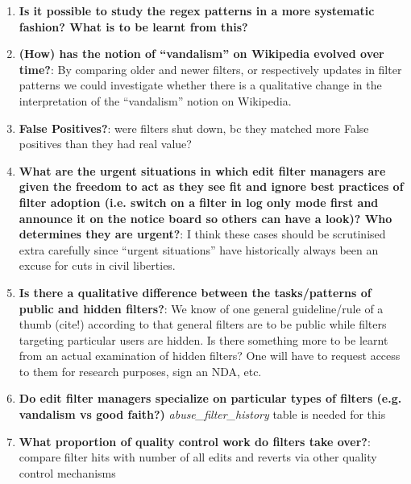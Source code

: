 \begin{enumerate}
\begin{comment}
Users are urged to use the term "vandalism" carefully, since it tends to offend and drive people away.
("When editors are editing in good faith, mislabeling their edits as vandalism makes them less likely to respond to corrective advice or to engage collaboratively during a disagreement,"~\cite{Wikipedia:Vandalism})
There are also various complaints/comments by users bewildered that their edits appear on an ``abuse log''
\end{comment}
    \item \textbf{Is it possible to study the regex patterns in a more systematic fashion? What is to be learnt from this?}%
    \item \textbf{(How) has the notion of ``vandalism'' on Wikipedia evolved over time?}: By comparing older and newer filters, or respectively updates in filter patterns we could investigate whether there is a qualitative change in the interpretation of the ``vandalism'' notion on Wikipedia.
    \item \textbf{False Positives?}: were filters shut down, bc they matched more False positives than they had real value?
    \item \textbf{What are the urgent situations in which edit filter managers are given the freedom to act as they see fit and ignore best practices of filter adoption (i.e. switch on a filter in log only mode first and announce it on the notice board so others can have a look)? Who determines they are urgent?}: I think these cases should be scrutinised extra carefully since ``urgent situations'' have historically always been an excuse for cuts in civil liberties.
    \item \textbf{Is there a qualitative difference between the tasks/patterns of public and hidden filters?}: We know of one general guideline/rule of a thumb (cite!) according to that general filters are to be public while filters targeting particular users are hidden. Is there something more to be learnt from an actual examination of hidden filters? One will have to request access to them for research purposes, sign an NDA, etc.
    \item \textbf{Do edit filter managers specialize on particular types of filters (e.g. vandalism vs good faith?)} \emph{abuse\_filter\_history } table is needed for this
    \item \textbf{What proportion of quality control work do filters take over?}: compare filter hits with number of all edits and reverts via other quality control mechanisms
\end{enumerate}
